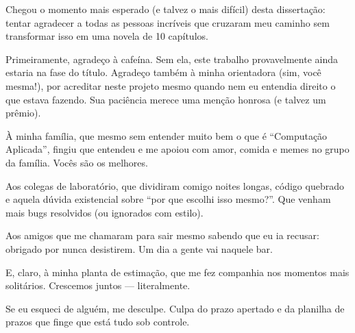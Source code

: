 

Chegou o momento mais esperado (e talvez o mais difícil) desta dissertação: tentar agradecer a todas as pessoas incríveis que cruzaram meu caminho sem transformar isso em uma novela de 10 capítulos.

Primeiramente, agradeço à cafeína. Sem ela, este trabalho provavelmente ainda estaria na fase do título. Agradeço também à minha orientadora (sim, você mesma!), por acreditar neste projeto mesmo quando nem eu entendia direito o que estava fazendo. Sua paciência merece uma menção honrosa (e talvez um prêmio).

À minha família, que mesmo sem entender muito bem o que é “Computação Aplicada”, fingiu que entendeu e me apoiou com amor, comida e memes no grupo da família. Vocês são os melhores.

Aos colegas de laboratório, que dividiram comigo noites longas, código quebrado e aquela dúvida existencial sobre “por que escolhi isso mesmo?”. Que venham mais bugs resolvidos (ou ignorados com estilo).

Aos amigos que me chamaram para sair mesmo sabendo que eu ia recusar: obrigado por nunca desistirem. Um dia a gente vai naquele bar.

E, claro, à minha planta de estimação, que me fez companhia nos momentos mais solitários. Crescemos juntos — literalmente.

Se eu esqueci de alguém, me desculpe. Culpa do prazo apertado e da planilha de prazos que finge que está tudo sob controle.



